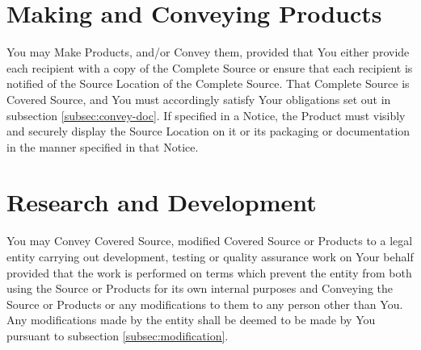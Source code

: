 \documentclass[10pt, a4paper]{article}
\begin{document}
\section{Making and Conveying Products}
\label{subsec:convey-products}
You may Make Products, and/or Convey them, provided that You either provide each recipient with a copy of the Complete Source or ensure that each recipient is notified of the Source Location of the Complete Source. That Complete Source is Covered Source, and You must accordingly satisfy Your obligations set out in subsection \ref*{subsec:convey-doc}. If specified in a Notice, the Product must visibly and securely display the Source Location on it or its packaging or documentation in the manner specified in that Notice. 

\section{Research and Development}
You may Convey Covered Source, modified Covered Source or Products to a legal entity carrying out development, testing or quality assurance work on Your behalf provided that the work is performed on terms which prevent the entity from both using the Source or Products for its own internal purposes and Conveying the Source or Products or any modifications to them to any person other than You. Any modifications made by the entity shall be deemed to be made by You pursuant to subsection \ref*{subsec:modification}.
\end{document}
